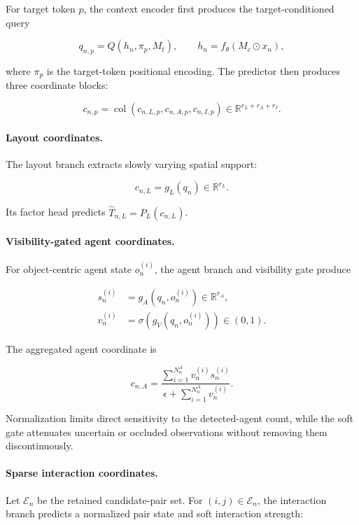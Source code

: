 For target token \(p\), the context encoder first produces the
target-conditioned query

\[
q_{n,p}
=
Q(h_n,\pi_p,M_t),
\qquad
h_n=f_\theta(M_c\odot x_n),
\]

where \(\pi_p\) is the target-token positional encoding. The predictor
then produces three coordinate blocks:

\[
c_{n,p}
=
\operatorname{col}
\left(
c_{n,L,p},
c_{n,A,p},
c_{n,I,p}
\right)
\in
\mathbb R^{r_L+r_A+r_I}.
\]

\paragraph{Layout coordinates.}
The layout branch extracts slowly varying spatial support:

\[
c_{n,L}=g_L(q_n)\in\mathbb R^{r_L}.
\]

Its factor head predicts
\(\widehat T_{n,L}=P_L(c_{n,L})\).

\paragraph{Visibility-gated agent coordinates.}
For object-centric agent state \(o_n^{(i)}\), the agent branch and
visibility gate produce

\begin{equation*}
\begin{aligned}
s_n^{(i)}
&=
g_A\!\left(q_n,o_n^{(i)}\right)
\in\mathbb{R}^{r_A},
\\
v_n^{(i)}
&=
\sigma\!\left(
g_V\!\left(q_n,o_n^{(i)}\right)
\right)
\in(0,1).
\end{aligned}
\end{equation*}

The aggregated agent coordinate is

\[
c_{n,A}
=
\frac{
\sum_{i=1}^{N_n^A}
v_n^{(i)}s_n^{(i)}
}{
\epsilon+
\sum_{i=1}^{N_n^A}v_n^{(i)}
}.
\]

Normalization limits direct sensitivity to the detected-agent count,
while the soft gate attenuates uncertain or occluded observations
without removing them discontinuously.

\paragraph{Sparse interaction coordinates.}
Let \(\mathcal E_n\) be the retained candidate-pair set. For
\((i,j)\in\mathcal E_n\), the interaction branch predicts a normalized
pair state and soft interaction strength:

